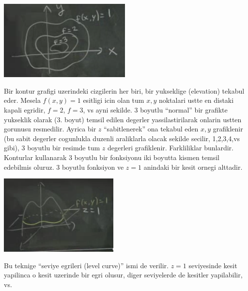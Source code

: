 \documentclass[12pt,fleqn]{article}
\begin{document}
\includegraphics[height=4cm]{8_7.png}

Bir kontur grafigi uzerindeki cizgilerin her biri, bir yukseklige
(elevation) tekabul eder. Mesela $f(x,y)=1$ esitligi icin olan tum $x,y$
noktalari ustte en distaki kapali egridir, $f=2$, $f=3$, vs ayni sekilde. 3
boyutlu ``normal'' bir grafikte yukseklik olarak (3. boyut) temsil edilen
degerler yassilastirilarak onlarin ustten gorunusu resmedilir. Ayrica bir
$z$ ``sabitlenerek'' ona tekabul eden $x,y$ grafiklenir (bu sabit degerler
cogunlukla duzenli araliklarla olacak sekilde secilir, 1,2,3,4,vs gibi), 3
boyutlu bir resimde tum $z$ degerleri grafiklenir. Farkliliklar
bunlardir. Konturlar kullanarak 3 boyutlu bir fonksiyonu iki boyutta kismen
temsil edebilmis oluruz. 3 boyutlu fonksiyon ve $z=1$ anindaki bir kesit
ornegi alttadir. 

\includegraphics[height=4cm]{8_8.png}

Bu teknige ``seviye egrileri (level curve)'' ismi de verilir. $z=1$
seviyesinde kesit yapilinca o kesit uzerinde bir egri olusur, diger
seviyelerde de kesitler yapilabilir, vs. 
\end{document}
